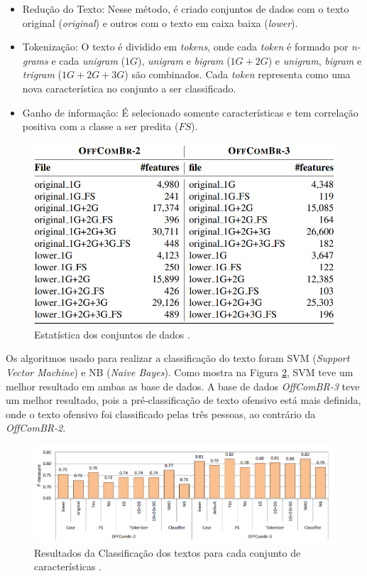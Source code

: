 \begin{itemize}
    \item Redução do Texto: Nesse método, é criado conjuntos de dados com o texto original ({\it original}) e outros com o texto em caixa baixa ({\it lower}).
    \item Tokenização: O texto é dividido em {\it tokens}, onde cada {\it token} é formado por {\it n-grams} e cada {\it unigram} (${1G}$), {\it unigram} e {\it bigram} (${1G+2G}$) e {\it unigram}, {\it bigram} e {\it trigram} (${1G+2G+3G}$) são combinados. Cada {\it token} representa como uma nova característica no conjunto a ser classificado.
    \item Ganho de informação: É selecionado somente características e tem correlação positiva com a classe a ser predita (${FS}$).
\end{itemize}

\begin{figure}[ht]
  \centering
  \includegraphics[height=0.3\textheight]{figuras/stats-datasets-offcombr.png}
  \caption{Estatística dos conjuntos de dados \cite{Pelle2017}.}
  \label{fig:pelle-statistic}
\end{figure}

Os algoritmos usado para realizar a classificação do texto foram SVM ({\it Support Vector Machine}) e NB ({\it Naive Bayes}). Como mostra na Figura \ref{fig:pelle-results}, SVM teve um melhor resultado em ambas as base de dados. A base de dados {\it OffComBR-3} teve um melhor resultado, pois a pré-classificação de texto ofensivo está mais definida, onde o texto ofensivo foi classificado pelas três pessoas, ao contrário da {\it OffComBR-2}.

\begin{figure}[ht]
  \centering
  \includegraphics[height=0.2\textheight]{figuras/results-datasets-offcombr.png}
  \caption{Resultados da Classificação dos textos para cada conjunto de características \cite{Pelle2017}.}
  \label{fig:pelle-results}
\end{figure}

